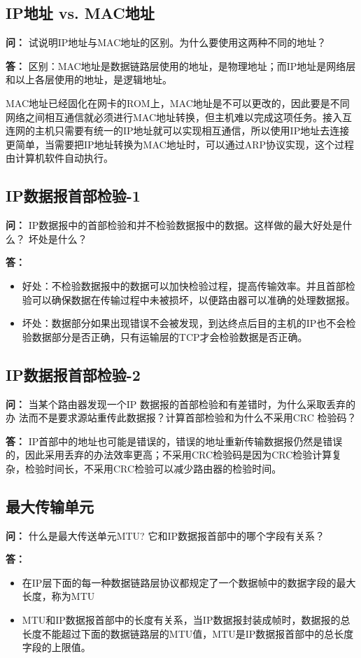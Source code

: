 \documentclass[12pt,hyperref,a4paper,UTF8]{ctexart}
\begin{document}
\subsection{IP地址 vs. MAC地址}
\textbf{问：}
试说明IP地址与MAC地址的区别。为什么要使用这两种不同的地址？

\textbf{答：}
区别：MAC地址是数据链路层使用的地址，是物理地址；而IP地址是网络层和以上各层使用的地址，是逻辑地址。

MAC地址已经固化在网卡的ROM上，MAC地址是不可以更改的，因此要是不同网络之间相互通信就必须进行MAC地址转换，但主机难以完成这项任务。接入互连网的主机只需要有统一的IP地址就可以实现相互通信，所以使用IP地址去连接更简单，当需要把IP地址转换为MAC地址时，可以通过ARP协议实现，这个过程由计算机软件自动执行。

\subsection{IP数据报首部检验-1}
\textbf{问：}
IP数据报中的首部检验和并不检验数据报中的数据。这样做的最大好处是什么？
坏处是什么？

\textbf{答：}
\begin{itemize}
    \item 好处：不检验数据报中的数据可以加快检验过程，提高传输效率。并且首部检验可以确保数据在传输过程中未被损坏，以便路由器可以准确的处理数据报。
    \item 坏处：数据部分如果出现错误不会被发现，到达终点后目的主机的IP也不会检验数据部分是否正确，只有运输层的TCP才会检验数据是否正确。
\end{itemize}

\subsection{IP数据报首部检验-2}
\textbf{问：}
当某个路由器发现一个IP 数据报的首部检验和有差错时，为什么采取丢弃的办
法而不是要求源站重传此数据报？计算首部检验和为什么不采用CRC 检验码？

\textbf{答：}
IP首部中的地址也可能是错误的，错误的地址重新传输数据报仍然是错误的，因此采用丢弃的办法效率更高；不采用CRC检验码是因为CRC检验计算复杂，检验时间长，不采用CRC检验可以减少路由器的检验时间。

\subsection{最大传输单元}
\textbf{问：}
什么是最大传送单元MTU? 它和IP数据报首部中的哪个字段有关系？

\textbf{答：}
\begin{itemize}
    \item 在IP层下面的每一种数据链路层协议都规定了一个数据帧中的数据字段的最大长度，称为MTU
    \item MTU和IP数据报首部中的长度有关系，当IP数据报封装成帧时，数据报的总长度不能超过下面的数据链路层的MTU值，MTU是IP数据报首部中的总长度字段的上限值。
\end{itemize}
\end{document}
